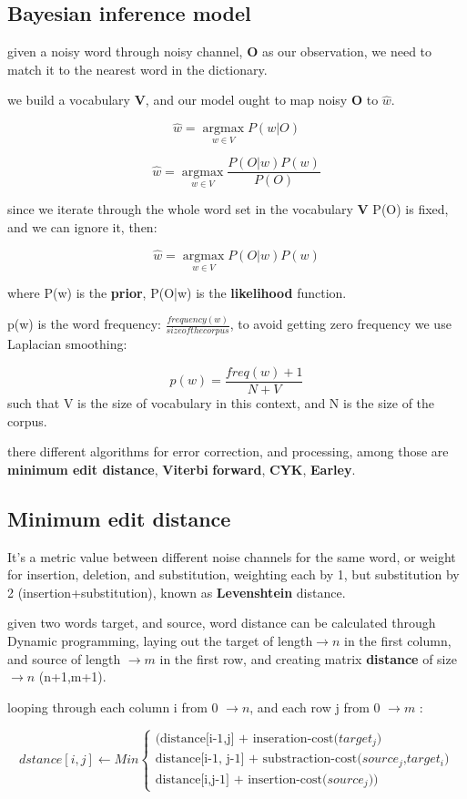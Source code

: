 \documentclass[4apaper,12pt]{book}
\begin{document}
\begin{description}
  \subsection{Bayesian inference model}
\item given a noisy word through noisy channel, \textbf{O} as our observation, we need to match it to the nearest word in the dictionary.
\item we build a vocabulary \textbf{V}, and our model ought to map noisy \textbf{O} to \textbf{$\hat{w}$}.
\item $$ \hat{w}=\underset{w \in V}{\operatorname{argmax}}P(w|O) $$
\item $$ \hat{w}=\underset{w \in V}{\operatorname{argmax}}\frac{P(O|w)P(w)}{P(O)} $$
\item since we iterate through the whole word set in the vocabulary \textbf{V} P(O) is fixed, and we can ignore it, then:
\item $$ \hat{w}=\underset{w \in V}{\operatorname{argmax}} P(O|w)P(w) $$
\item where P(w) is the \textbf{prior}, P(O|w) is the \textbf{likelihood} function.
\item p(w) is the word frequency: $\frac{frequency(w)}{size of the corpus}$, to avoid getting zero frequency we use Laplacian smoothing:
\item $$ p(w)=\frac{freq(w)+1}{N+V} $$ such that V is the size of vocabulary in this context, and N is the size of the corpus.
\item there different algorithms for error correction, and processing, among those are \textbf{minimum edit distance}, \textbf{Viterbi} \textbf{forward}, \textbf{CYK}, \textbf{Earley}.
  \subsection{Minimum edit distance}
\item It's a metric value between different noise channels for the same word, or weight for insertion, deletion, and substitution, weighting each by 1, but substitution by 2 (insertion+substitution), known as \textbf{Levenshtein} distance.
\item given two words target, and source, word distance can be calculated through Dynamic programming, laying out the target of length$\rightarrow{n}$ in the first column, and source of length $\rightarrow{m}$ in the first row, and creating matrix \textbf{distance} of size $\rightarrow{n}$ (n+1,m+1).
\item looping through each column i from 0 $\rightarrow{n}$, and each row j from 0 $\rightarrow{m}$ :
\item $$dstance[i,j] \leftarrow Min \begin{cases} \text{(distance[i-1,j] + inseration-cost($target_j$)}\\ \text{distance[i-1, j-1] + substraction-cost($source_j$,$target_i$)}\\ \text{distance[i,j-1] + insertion-cost($source_j$))}\end{cases}$$
\end{description}
\end{document}
